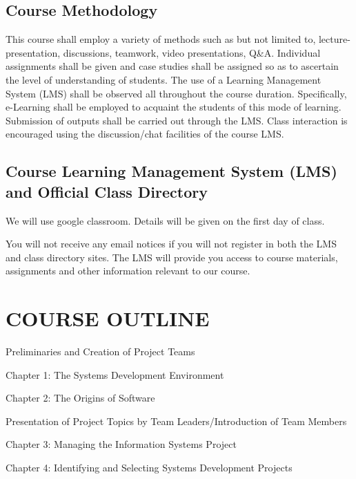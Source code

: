 \hypertarget{course-methodology}{%
\subsection{Course Methodology}\label{course-methodology}}

This course shall employ a variety of methods such as but not limited
to, lecture-presentation, discussions, teamwork, video presentations,
Q\&A. Individual assignments shall be given and case studies shall be
assigned so as to ascertain the level of understanding of students. The
use of a Learning Management System (LMS) shall be observed all
throughout the course duration. Specifically, e-Learning shall be
employed to acquaint the students of this mode of learning. Submission
of outputs shall be carried out through the LMS. Class interaction is
encouraged using the discussion/chat facilities of the course LMS.

\hypertarget{course-learning-management-system-lms-and-official-class-directory}{%
\subsection{Course Learning Management System (LMS) and Official Class
Directory}\label{course-learning-management-system-lms-and-official-class-directory}}

We will use google classroom. Details will be given on the first day of
class.

You will not receive any email notices if you will not register in both
the LMS and class directory sites. The LMS will provide you access to
course materials, assignments and other information relevant to our
course.

\hypertarget{course-outline}{%
\section{COURSE OUTLINE}\label{course-outline}}

Preliminaries and Creation of Project Teams

Chapter 1: The Systems Development Environment

Chapter 2: The Origins of Software

Presentation of Project Topics by Team Leaders/Introduction of Team
Members

Chapter 3: Managing the Information Systems Project

Chapter 4: Identifying and Selecting Systems Development Projects

